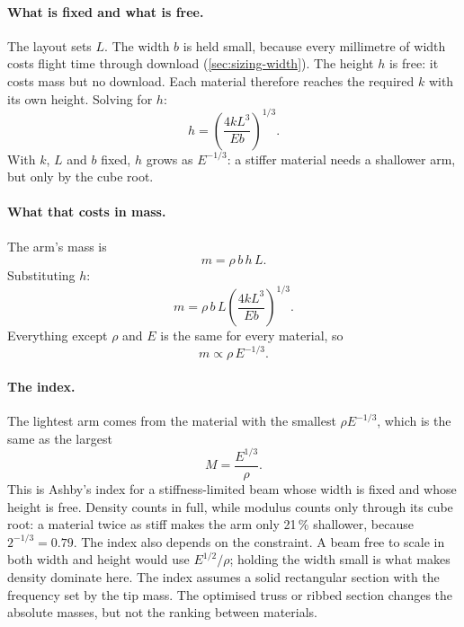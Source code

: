 \paragraph{What is fixed and what is free.} The layout sets $L$. The width $b$ is held small, because every millimetre of width costs flight time through download (\cref{sec:sizing-width}). The height $h$ is free: it costs mass but no download. Each material therefore reaches the required $k$ with its own height. Solving for $h$:
\begin{equation}
h = \left(\frac{4kL^3}{Eb}\right)^{1/3}.
\end{equation}
With $k$, $L$ and $b$ fixed, $h$ grows as $E^{-1/3}$: a stiffer material needs a shallower arm, but only by the cube root.

\paragraph{What that costs in mass.} The arm's mass is
\begin{equation}
m = \rho\, b\, h\, L.
\end{equation}
Substituting $h$:
\begin{equation}
m = \rho\, b\, L \left(\frac{4kL^3}{Eb}\right)^{1/3}.
\end{equation}
Everything except $\rho$ and $E$ is the same for every material, so
\begin{equation}
m \propto \rho\, E^{-1/3}.
\end{equation}

\paragraph{The index.} The lightest arm comes from the material with the smallest $\rho E^{-1/3}$, which is the same as the largest
\begin{equation}
M = \frac{E^{1/3}}{\rho}.
\end{equation}
This is Ashby's index for a stiffness-limited beam whose width is fixed and whose height is free. Density counts in full, while modulus counts only through its cube root: a material twice as stiff makes the arm only 21\,\% shallower, because $2^{-1/3} = 0.79$. The index also depends on the constraint. A beam free to scale in both width and height would use $E^{1/2}/\rho$; holding the width small is what makes density dominate here. The index assumes a solid rectangular section with the frequency set by the tip mass. The optimised truss or ribbed section changes the absolute masses, but not the ranking between materials.

